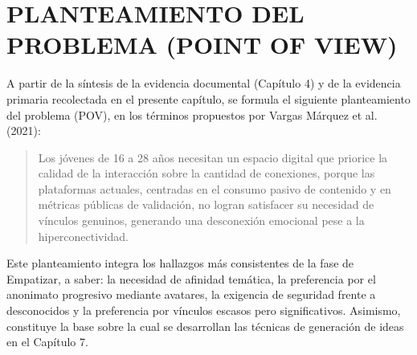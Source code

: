 \section{PLANTEAMIENTO DEL PROBLEMA (POINT OF VIEW)}
A partir de la síntesis de la evidencia documental (Capítulo 4) y de la evidencia primaria recolectada en el presente capítulo, se formula el siguiente planteamiento del problema (POV), en los términos propuestos por Vargas Márquez et al. (2021):

\begin{quote}
Los jóvenes de 16 a 28 años necesitan un espacio digital que priorice la calidad de la interacción sobre la cantidad de conexiones, porque las plataformas actuales, centradas en el consumo pasivo de contenido y en métricas públicas de validación, no logran satisfacer su necesidad de vínculos genuinos, generando una desconexión emocional pese a la hiperconectividad.
\end{quote}

Este planteamiento integra los hallazgos más consistentes de la fase de Empatizar, a saber: la necesidad de afinidad temática, la preferencia por el anonimato progresivo mediante avatares, la exigencia de seguridad frente a desconocidos y la preferencia por vínculos escasos pero significativos. Asimismo, constituye la base sobre la cual se desarrollan las técnicas de generación de ideas en el Capítulo 7.